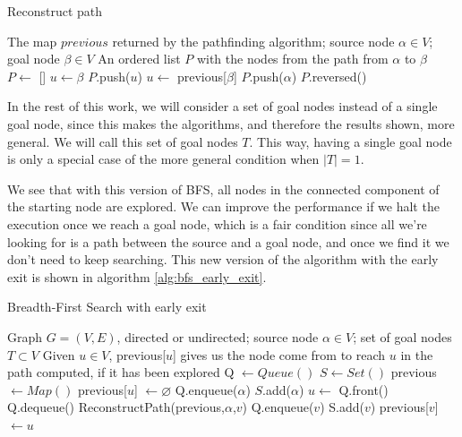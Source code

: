 \documentclass[a4paper,10pt]{report}
\begin{document}
\begin{algorithm}
\caption{Reconstruct path}
\label{alg:reconstruct}
\begin{algorithmic}[1]
\Require The map $previous$ returned by the pathfinding algorithm; source node $\alpha \in V$; goal node $\beta \in V$
\Ensure An ordered list $P$ with the nodes from the path from $\alpha$ to $\beta$
\State $P \gets$ []  
\State $u \gets \beta$
	\State $P$.push($u$)
	\State $u \gets$ previous[$\beta$]
\EndWhile
\State $P$.push($\alpha$)
\State \Return $P$.reversed()
\EndProcedure
\end{algorithmic}
\end{algorithm}

In the rest of this work, we will consider a set of goal nodes instead of a single goal node, since this makes the algorithms, and therefore the results shown, more general. We will call this set of goal nodes $T$. This way, having a single goal node is only a special case of the more general condition when $|T| = 1$.

We see that with this version of BFS, all nodes in the connected component of the starting node are explored. We can improve the performance if we halt the execution once we reach a goal node, which is a fair condition since all we're looking for is a path between the source and a goal node, and once we find it we don't need to keep searching. This new version of the algorithm with the early exit is shown in algorithm \ref{alg:bfs_early_exit}.

\begin{algorithm}
\caption{Breadth-First Search with early exit}
\label{alg:bfs_early_exit}
\begin{algorithmic}[1]
\Require Graph $G = (V, E)$, directed or undirected; source node $\alpha \in V$; set of goal nodes $T \subset V$
\Ensure Given $u \in V$, previous[$u$] gives us the node come from to reach $u$ in the path computed, if it has been explored
\State Q $\gets Queue()$
\State $S \gets Set()$
\State previous $\gets Map()$
	\State previous[$u$] $\gets \varnothing$
\EndFor
\State Q.enqueue($\alpha$)
\State $S$.add($\alpha$)
	\State $u \gets$ Q.front()
	\State Q.dequeue()
			 
				\State \Return ReconstructPath(previous,$\alpha$,$v$)
			\EndIf
			\State Q.enqueue($v$)
			\State S.add($v$)
			\State previous[$v$] $\gets u$
		\EndIf
	\EndFor
\EndWhile
\EndProcedure
\end{algorithmic}
\end{algorithm}
\end{document}
